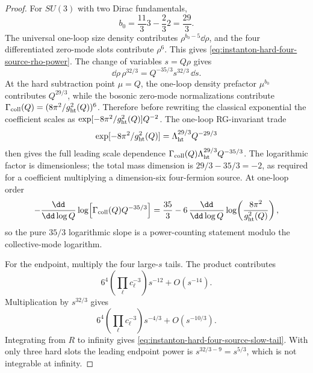 \begin{proof}
For \(SU(3)\) with two Dirac fundamentals,
\[
  b_0=\frac{11}{3}3-\frac{2}{3}2=\frac{29}{3}.
\]
The universal one-loop size density contributes \(\rho^{b_0-5}\dd\rho\), and
the four differentiated zero-mode slots contribute \(\rho^6\).  This gives
\eqref{eq:instanton-hard-four-source-rho-power}.  The change of variables
\(s=Q\rho\) gives
\[
  \dd\rho\,\rho^{32/3}
  =
  Q^{-35/3}s^{32/3}\,\dd s .
\]
At the hard subtraction point \(\mu=Q\), the one-loop density prefactor
\(\mu^{b_0}\) contributes \(Q^{29/3}\), while the bosonic zero-mode
normalizations contribute
\(\Gamma_{\rm coll}(Q)=(8\pi^2/g_{\rm ht}^2(Q))^6\).  Therefore before
rewriting the classical exponential the coefficient scales as
\(\exp[-8\pi^2/g_{\rm ht}^2(Q)]Q^{-2}\).  The one-loop RG-invariant trade
\[
  \exp[-8\pi^2/g_{\rm ht}^2(Q)]
  =
  \Lambda_{\rm ht}^{29/3}Q^{-29/3}
\]
then gives the full leading scale dependence
\(\Gamma_{\rm coll}(Q)\Lambda_{\rm ht}^{29/3}Q^{-35/3}\).  The logarithmic
factor is dimensionless; the total mass dimension is \(29/3-35/3=-2\), as
required for a coefficient multiplying a dimension-six four-fermion source.
At one-loop order
\[
  -\frac{\dd}{\dd\log Q}
  \log\!\left[\Gamma_{\rm coll}(Q)Q^{-35/3}\right]
  =
  \frac{35}{3}
  -6\,\frac{\dd}{\dd\log Q}
  \log\!\left(\frac{8\pi^2}{g_{\rm ht}^2(Q)}\right),
\]
so the pure \(35/3\) logarithmic slope is a power-counting statement modulo
the collective-mode logarithm.

For the endpoint, multiply the four large-\(s\) tails.  The product contributes
\[
  6^4\left(\prod_\ell c_\ell^{-3}\right)s^{-12}+O(s^{-14}).
\]
Multiplication by \(s^{32/3}\) gives
\[
  6^4\left(\prod_\ell c_\ell^{-3}\right)s^{-4/3}+O(s^{-10/3}).
\]
Integrating from \(R\) to infinity gives
\eqref{eq:instanton-hard-four-source-slow-tail}.  With only three hard slots
the leading endpoint power is \(s^{32/3-9}=s^{5/3}\), which is not integrable
at infinity.
\end{proof}

